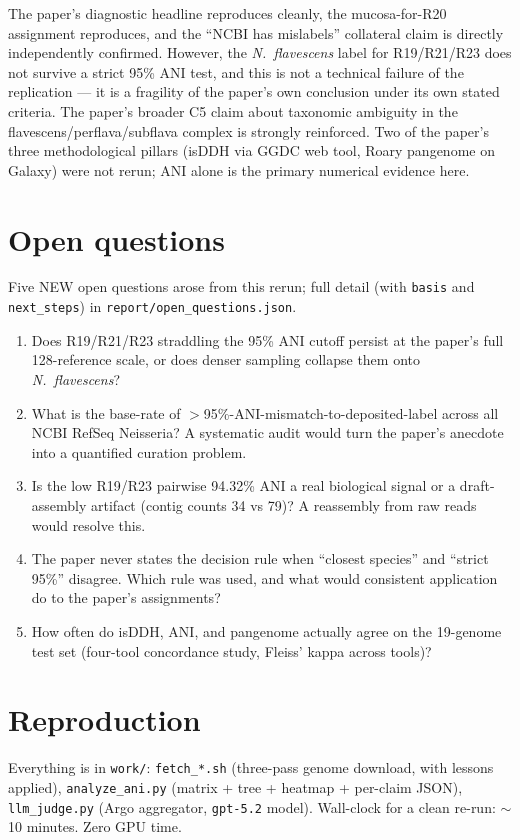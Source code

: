\documentclass[11pt]{article}
\begin{document}
The paper's diagnostic headline reproduces cleanly, the mucosa-for-R20 assignment reproduces, and the ``NCBI has mislabels'' collateral claim is directly independently confirmed. However, the \emph{N.\ flavescens} label for R19/R21/R23 does not survive a strict 95\% ANI test, and this is not a technical failure of the replication --- it is a fragility of the paper's own conclusion under its own stated criteria. The paper's broader C5 claim about taxonomic ambiguity in the flavescens/perflava/subflava complex is strongly reinforced. Two of the paper's three methodological pillars (isDDH via GGDC web tool, Roary pangenome on Galaxy) were not rerun; ANI alone is the primary numerical evidence here.

\section{Open questions}

Five NEW open questions arose from this rerun; full detail (with \texttt{basis} and \texttt{next\_steps}) in \texttt{report/open\_questions.json}.

\begin{enumerate}
\item[\textbf{Q1}] Does R19/R21/R23 straddling the 95\% ANI cutoff persist at the paper's full 128-reference scale, or does denser sampling collapse them onto \emph{N.\ flavescens}?
\item[\textbf{Q2}] What is the base-rate of $>$95\%-ANI-mismatch-to-deposited-label across all NCBI RefSeq Neisseria? A systematic audit would turn the paper's anecdote into a quantified curation problem.
\item[\textbf{Q3}] Is the low R19/R23 pairwise 94.32\% ANI a real biological signal or a draft-assembly artifact (contig counts 34 vs 79)? A reassembly from raw reads would resolve this.
\item[\textbf{Q4}] The paper never states the decision rule when ``closest species'' and ``strict 95\%'' disagree. Which rule was used, and what would consistent application do to the paper's assignments?
\item[\textbf{Q5}] How often do isDDH, ANI, and pangenome actually agree on the 19-genome test set (four-tool concordance study, Fleiss' kappa across tools)?
\end{enumerate}

\section*{Reproduction}

Everything is in \texttt{work/}: \texttt{fetch\_*.sh} (three-pass genome download, with lessons applied), \texttt{analyze\_ani.py} (matrix + tree + heatmap + per-claim JSON), \texttt{llm\_judge.py} (Argo aggregator, \texttt{gpt-5.2} model). Wall-clock for a clean re-run: $\sim$10 minutes. Zero GPU time.
\end{document}
